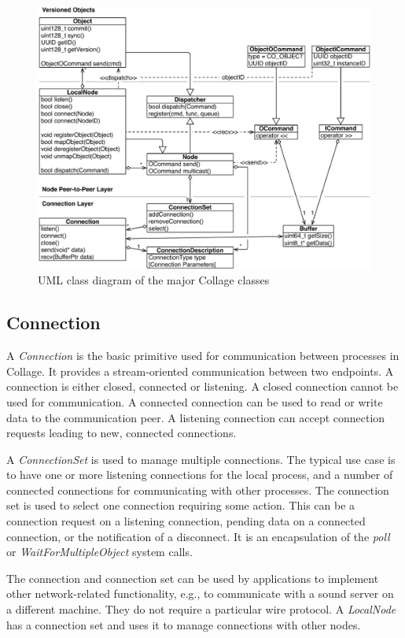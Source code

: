 \begin{figure}[h!t]\center
  \includegraphics[width=\textwidth]{images/collageUML}
  {\caption{\label{fCollageUML}UML class diagram of the major Collage classes}}
\end{figure}

\subsection{Connection}

A {\em Connection} is the basic primitive used for communication between
processes in Collage. It provides a stream-oriented communication between two
endpoints. A connection is either closed, connected or listening. A closed
connection cannot be used for communication. A connected connection can be
used to read or write data to the communication peer. A listening connection
can accept connection requests leading to new, connected connections.

A {\em ConnectionSet} is used to manage multiple connections. The typical use
case is to have one or more listening connections for the local process, and a
number of connected connections for communicating with other processes. The
connection set is used to select one connection requiring some action.
This can be a connection request on a listening connection, pending data on a
connected connection, or the notification of a disconnect. It is an
encapsulation of the {\em poll} or {\em WaitForMultipleObject} system calls.

The connection and connection set can be used by applications to implement
other network-related functionality, e.g., to communicate with a sound server
on a different machine. They do not require a particular wire protocol. A
{\em LocalNode} has a connection set and uses it to manage connections
with other nodes.

